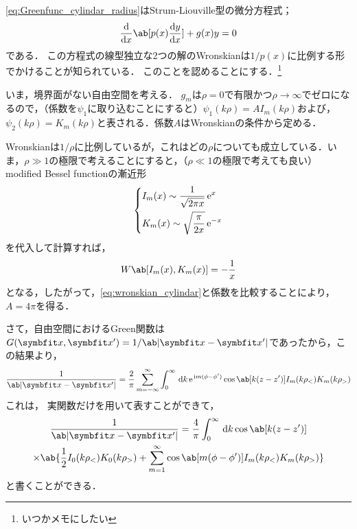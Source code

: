 \eqref{eq:Greenfunc_cylindar_radius}はStrum-Liouville型の微分方程式；
\begin{gather}
  \diff**{x}{\ab[p(x) \diff{y}{x}]} + g(x) y = 0
\end{gather}
である．
この方程式の線型独立な2つの解のWronskianは$1/p(x)$に比例する形でかけることが知られている．
このことを認めることにする．\footnote{いつかメモにしたい}

いま，境界面がない自由空間を考える．
$g_m$は$\rho = 0$で有限かつ$\rho \to \infty$でゼロになるので，（係数を$\psi_1$に取り込むことにすると）$\psi_1(k\rho) = AI_m(k\rho)$および，$\psi_2(k\rho) = K_m(k\rho)$と表される．係数$A$はWronskianの条件から定める．

Wronskianは$1/\rho$に比例しているが，これはどの$\rho$についても成立している．いま，$\rho \gg 1$の極限で考えることにすると，（$\rho \ll 1$の極限で考えても良い）
modified Bessel functionの漸近形
\begin{gather}  
  \begin{dcases}
    I_m(x) \sim \frac{1}{\sqrt{2\pi x}}\,\mathrm{e}^x\\
    K_m(x) \sim \sqrt{\frac{\pi}{2x}}\,\mathrm{e}^{-x}
  \end{dcases}
\end{gather}
を代入して計算すれば，
\begin{gather}
  W \ab[I_m(x), K_m(x)] = -\frac{1}{x}
\end{gather}
となる，したがって，\eqref{eq:wronskian_cylindar}と係数を比較することにより，$A = 4\pi$を得る．

さて，自由空間におけるGreen関数は$G(\bs{x}, \bs{x}') = 1 / \ab|\bs{x} - \bs{x}'|$であったから，この結果より，
\begin{gather}
  \frac{1}{\ab|\bs{x} - \bs{x}'|} = \frac{2}{\pi} \sum_{m=-\infty}^{\infty} \int_0^\infty \dl{k} \e^{\i m(\phi - \phi')} \cos\ab[k(z - z')] I_m(k\rho_<) K_m(k\rho_>)
\end{gather}
これは，
実関数だけを用いて表すことができて，
\begin{multline}
  \frac{1}{\ab|\bs{x} - \bs{x}'|} = \frac{4}{\pi} \int_0^\infty \dl{k} \cos\ab[k(z - z')] \\
  \times \ab\{\frac{1}{2}I_0(k\rho_<)K_0(k\rho_>) + \sum_{m=1}^\infty \cos\ab[m(\phi - \phi')] I_m(k\rho_<) K_m(k\rho_>)\}
\end{multline}
と書くことができる．

